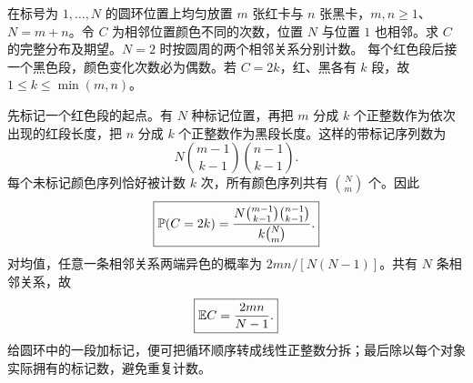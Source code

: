 在标号为 $1,\ldots,N$ 的圆环位置上均匀放置 $m$ 张红卡与 $n$ 张黑卡，$m,n\ge1$、$N=m+n$。令 $C$ 为相邻位置颜色不同的次数，位置 $N$ 与位置 $1$ 也相邻。求 $C$ 的完整分布及期望。$N=2$ 时按圆周的两个相邻关系分别计数。
\solution 每个红色段后接一个黑色段，颜色变化次数必为偶数。若 $C=2k$，红、黑各有 $k$ 段，故 $1\le k\le\min(m,n)$。

先标记一个红色段的起点。有 $N$ 种标记位置，再把 $m$ 分成 $k$ 个正整数作为依次出现的红段长度，把 $n$ 分成 $k$ 个正整数作为黑段长度。这样的带标记序列数为
\[
N\binom{m-1}{k-1}\binom{n-1}{k-1}.
\]
每个未标记颜色序列恰好被计数 $k$ 次，所有颜色序列共有 $\binom Nm$ 个。因此
\[
\boxed{\mathbb{P}(C=2k)=\frac{N\binom{m-1}{k-1}\binom{n-1}{k-1}}
{k\binom Nm}.}
\]
对均值，任意一条相邻关系两端异色的概率为 $2mn/[N(N-1)]$。共有 $N$ 条相邻关系，故
\[
\boxed{\mathbb{E} C=\frac{2mn}{N-1}.}
\]
\insight 给圆环中的一段加标记，便可把循环顺序转成线性正整数分拆；最后除以每个对象实际拥有的标记数，避免重复计数。
